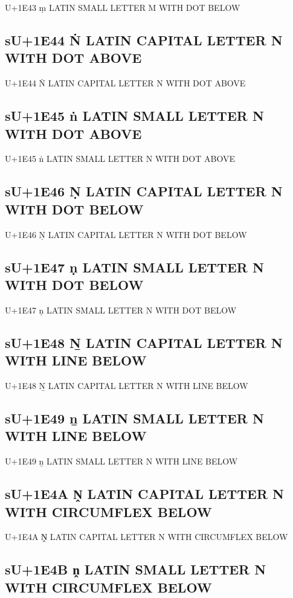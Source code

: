 U+1E43 ṃ LATIN SMALL LETTER M WITH DOT BELOW

\subsection{sU+1E44 Ṅ LATIN CAPITAL LETTER N WITH DOT ABOVE}

U+1E44 Ṅ LATIN CAPITAL LETTER N WITH DOT ABOVE

\subsection{sU+1E45 ṅ LATIN SMALL LETTER N WITH DOT ABOVE}

U+1E45 ṅ LATIN SMALL LETTER N WITH DOT ABOVE

\subsection{sU+1E46 Ṇ LATIN CAPITAL LETTER N WITH DOT BELOW}

U+1E46 Ṇ LATIN CAPITAL LETTER N WITH DOT BELOW

\subsection{sU+1E47 ṇ LATIN SMALL LETTER N WITH DOT BELOW}

U+1E47 ṇ LATIN SMALL LETTER N WITH DOT BELOW

\subsection{sU+1E48 Ṉ LATIN CAPITAL LETTER N WITH LINE BELOW}

U+1E48 Ṉ LATIN CAPITAL LETTER N WITH LINE BELOW

\subsection{sU+1E49 ṉ LATIN SMALL LETTER N WITH LINE BELOW}

U+1E49 ṉ LATIN SMALL LETTER N WITH LINE BELOW

\subsection{sU+1E4A Ṋ LATIN CAPITAL LETTER N WITH CIRCUMFLEX BELOW}

U+1E4A Ṋ LATIN CAPITAL LETTER N WITH CIRCUMFLEX BELOW

\subsection{sU+1E4B ṋ LATIN SMALL LETTER N WITH CIRCUMFLEX BELOW}

